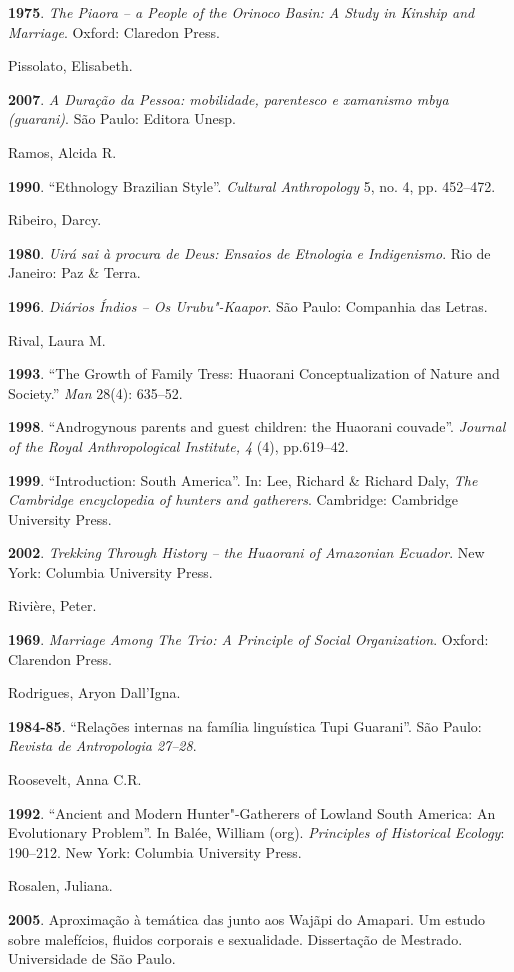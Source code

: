 \textbf{1975}. \emph{The Piaora -- a People of the Orinoco Basin: A Study
in Kinship and Marriage}. Oxford: Claredon Press.

Pissolato, Elisabeth.

\textbf{2007}. \emph{A Duração da Pessoa: mobilidade, parentesco e
xamanismo mbya (guarani)}. São Paulo: Editora Unesp.

Ramos, Alcida R.

\textbf{1990}. ``Ethnology Brazilian Style''. \emph{Cultural Anthropology}
5, no. 4, pp. 452--472.

Ribeiro, Darcy.

\textbf{1980}. \emph{Uirá sai à procura de Deus: Ensaios de Etnologia e
Indigenismo}. Rio de Janeiro: Paz \& Terra.

\textbf{1996}. \emph{Diários Índios -- Os Urubu"-Kaapor}. São Paulo:
Companhia das Letras.

Rival, Laura M.

\textbf{1993}. ``The Growth of Family Tress: Huaorani Conceptualization
of Nature and Society.'' \emph{Man} 28(4): 635--52.

\textbf{1998}. ``Androgynous parents and guest children: the Huaorani
couvade''. \emph{Journal of the Royal Anthropological Institute, 4} (4),
pp.619--42.

\textbf{1999}. ``Introduction: South America''. In: Lee, Richard \& Richard
Daly, \emph{The Cambridge encyclopedia of hunters and gatherers}.
Cambridge: Cambridge University Press.

\textbf{2002}. \emph{Trekking Through History -- the Huaorani of
Amazonian Ecuador}. New York: Columbia University Press.

Rivière, Peter.

\textbf{1969}. \emph{Marriage Among The Trio: A Principle of Social
Organization}. Oxford: Clarendon Press.

Rodrigues, Aryon Dall'Igna.

\textbf{1984-85}. ``Relações internas na família linguística Tupi
Guarani''. São Paulo: \emph{Revista de Antropologia 27--28}.

Roosevelt, Anna C.R.

\textbf{1992}. ``Ancient and Modern Hunter"-Gatherers of Lowland South
America: An Evolutionary Problem''. In Balée, William (org).
\emph{Principles of Historical Ecology}: 190--212. New York: Columbia
University Press.

Rosalen, Juliana.

\textbf{2005}. Aproximação à temática das  junto aos Wajãpi do
Amapari. Um estudo sobre malefícios, fluidos corporais e sexualidade.
Dissertação de Mestrado. Universidade de São Paulo.

